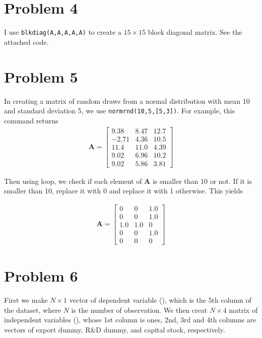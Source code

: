 \documentclass[11pt,letter]{article}
\newcommand{\vect}[1]{\boldsymbol{\mathbf{#1}}}
\newcounter{lem}[section] \setcounter{lem}{0}
\newcommand{\code}[1]{\texttt{#1}}
\begin{document}
\section*{Problem 4}
I use \code{blkdiag(A,A,A,A,A)} to create a $15\times15$ block diagonal matrix. See the attached code.

\section*{Problem 5}

In creating a matrix of random draws from a normal distribution with mean 10 and standard deviation 5, we use \code{normrnd(10,5,[5,3])}. For example, this command returns
\begin{align*}
\vect{A} = \left[\begin{array}{rrr} 9.38 & 8.47 & 12.7\\ -2.71 & 4.36 & 10.5\\ 11.4 & 11.0 & 4.39\\ 9.02 & 6.96 & 10.2\\ 9.02 & 5.86 & 3.81 \end{array}\right]
\end{align*}

Then using loop, we check if each element of $\vect{A}$ is smaller than 10 or not. If it is smaller than 10, replace it with 0 and replace it with 1 otherwise. This yields

\begin{align*}
\vect{A} = \left[\begin{array}{rrr} 0 & 0 & 1.0\\ 0 & 0 & 1.0\\ 1.0 & 1.0 & 0\\ 0 & 0 & 1.0\\ 0 & 0 & 0 \end{array}\right]
\end{align*}

\section*{Problem 6}

First we make $N\times 1$ vector of dependent variable (\vect{Y}), which is the 5th column of the dataset, where $N$ is the number of observation. We then creat $N\times 4$ matrix of independent variables (\vect{X}),  whose 1st column is ones, 2nd, 3rd and 4th columns are vectors of export dummy, R\&D dummy, and capital stock, respectively. 
\end{document}
